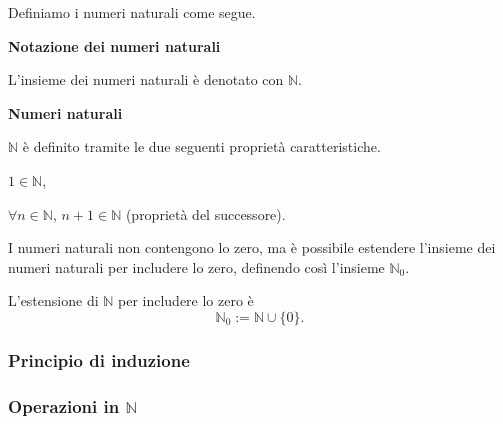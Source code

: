 Definiamo i numeri naturali come segue.

\begin{definition}
    \textbf{Notazione dei numeri naturali}

    L'insieme dei numeri naturali è denotato con $\mathbb{N}$.
\end{definition}

\begin{definition}
    \textbf{Numeri naturali}
    \label{def:naturals}
    
    $ \mathbb{N}$ è definito tramite le due seguenti proprietà caratteristiche.
    \begin{list_2}
        \item $1 \in \mathbb{N}$,
        \item $\forall n \in \mathbb{N}$, $ n + 1 \in \mathbb{N}$ (proprietà del successore).
    \end{list_2}
\end{definition}

\begin{observation}
    I numeri naturali non contengono lo zero, ma è possibile estendere
    l'insieme dei numeri naturali per includere lo zero, definendo così l'insieme $\mathbb{N}_0$.
\end{observation}

\begin{definition}
    L'estensione di $\mathbb{N}$ per includere lo zero è
    \[
        \mathbb{N}_0 := \mathbb{N} \cup \{0\}.
    \]
\end{definition}
    

\vspace{0.7cm}


\subsubsection{Principio di induzione}



\subsubsection{Operazioni in $\mathbb{N}$}



